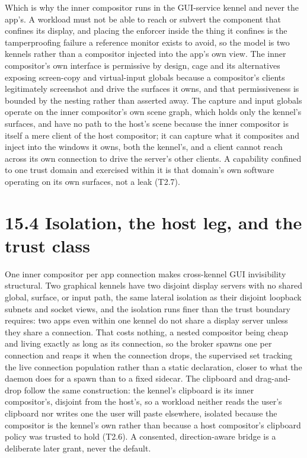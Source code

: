 Which is why the inner compositor runs in the GUI-service kennel and
never the app's. A workload must not be able to reach or subvert the
component that confines its display, and placing the enforcer inside the
thing it confines is the tamperproofing failure a reference monitor
exists to avoid, so the model is two kennels rather than a compositor
injected into the app's own view. The inner compositor's own interface
is permissive by design, cage and its alternatives exposing screen-copy
and virtual-input globals because a compositor's clients legitimately
screenshot and drive the surfaces it owns, and that permissiveness is
bounded by the nesting rather than asserted away. The capture and input
globals operate on the inner compositor's own scene graph, which holds
only the kennel's surfaces, and have no path to the host's scene because
the inner compositor is itself a mere client of the host compositor; it
can capture what it composites and inject into the windows it owns, both
the kennel's, and a client cannot reach across its own connection to
drive the server's other clients. A capability confined to one trust
domain and exercised within it is that domain's own software operating
on its own surfaces, not a leak (T2.7).

\hypertarget{isolation-the-host-leg-and-the-trust-class}{%
\section{15.4 Isolation, the host leg, and the trust
class}\label{isolation-the-host-leg-and-the-trust-class}}

One inner compositor per app connection makes cross-kennel GUI
invisibility structural. Two graphical kennels have two disjoint display
servers with no shared global, surface, or input path, the same lateral
isolation as their disjoint loopback subnets and socket views, and the
isolation runs finer than the trust boundary requires: two apps even
within one kennel do not share a display server unless they share a
connection. That costs nothing, a nested compositor being cheap and
living exactly as long as its connection, so the broker spawns one per
connection and reaps it when the connection drops, the supervised set
tracking the live connection population rather than a static
declaration, closer to what the daemon does for a spawn than to a fixed
sidecar. The clipboard and drag-and-drop follow the same construction:
the kennel's clipboard is its inner compositor's, disjoint from the
host's, so a workload neither reads the user's clipboard nor writes one
the user will paste elsewhere, isolated because the compositor is the
kennel's own rather than because a host compositor's clipboard policy
was trusted to hold (T2.6). A consented, direction-aware bridge is a
deliberate later grant, never the default.

